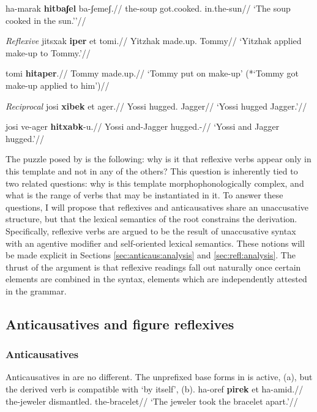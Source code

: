 	\a \begingl
		\gla ha-marak \textbf{hitbaʃel} ba-ʃemeʃ.//
		\glb the-soup got.cooked. in.the-sun//
		\glft `The soup cooked in the sun.''//
	\endgl
\xe

\pex\label{ex:intro-refl}\textit{Reflexive}
	\a \begingl
		\gla jitsxak \textbf{iper} et tomi.//
		\glb Yitzhak made.up.  Tommy//
		\glft `Yitzhak applied make-up to Tommy.'//
	\endgl
	
	\a \begingl
		\gla tomi \textbf{hitaper}.//
		\glb Tommy made.up.//
		\glft `Tommy put on make-up' (*`Tommy got make-up applied to him')//
	\endgl
\xe

\pex\label{ex:intro-recip}\textit{Reciprocal}
	\a \begingl
		\gla josi \textbf{xibek} et {\textdyoghlig}ager.//
		\glb Yossi hugged.  Jagger//
		\glft `Yossi hugged Jagger.'//
	\endgl
	
	\a \begingl
		\gla josi ve-{\textdyoghlig}ager \textbf{hitxabk}-u.//
		\glb Yossi and-Jagger hugged.-//
		\glft `Yossi and Jagger hugged.'//
	\endgl
\xe

The puzzle posed by {\thit} is the following: why is it that reflexive verbs appear only in this template and not in any of the others? This question is inherently tied to two related questions: why is this template morphophonologically complex, and what is the range of verbs that may be instantiated in it. To answer these questions, I will propose that reflexives and anticausatives share an unaccusative structure, but that the lexical semantics of the root constrains the derivation. Specifically, reflexive verbs are argued to be the result of unaccusative syntax with an agentive modifier and self-oriented lexical semantics. These notions will be made explicit in Sections \ref{sec:anticaus:analysis} and \ref{sec:refl:analysis}. The thrust of the argument is that reflexive readings fall out naturally once certain elements are combined in the syntax, elements which are independently attested in the grammar.

	
	\subsection{Anticausatives and figure reflexives}
		\subsubsection{Anticausatives}

Anticausatives in {\thit} are no different. The unprefixed base forms in {\tpie} is active, (\nextx a), but the derived verb is compatible with `by itself', (\nextx b).
\pex
\a \begingl
\gla ha-{\texttslig}oref \textbf{pirek} et ha-{\texttslig}amid.//
\glb the-jeweler dismantled.  the-bracelet//
\glft `The jeweler took the bracelet apart.'//
\endgl

